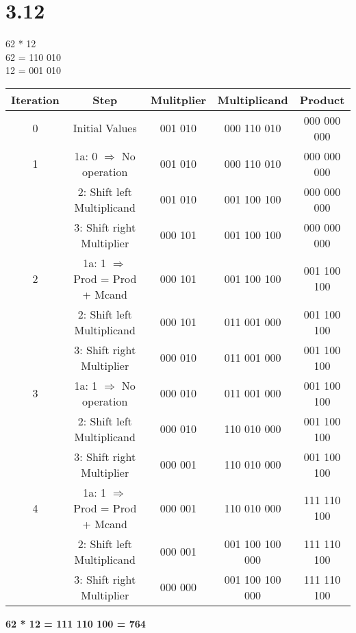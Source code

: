 \documentclass[12pt]{article}
\begin{document}
\section*{3.12}
62 * 12\\
62 = 110 010\\
12 = 001 010\\
\begin{tabular}{|c|c|c|c|c|}
	\hline
	Iteration & Step & Mulitplier & Multiplicand & Product \\
	\hline
	0 & Initial Values & 001 010 & 000 110 010 & 000 000 000\\
	\hline
	1 & 1a: 0 $\Rightarrow$ No operation & 001 010 & 000 110 010 & 000 000 000\\
	  & 2: Shift left Multiplicand & 001 010 & 001 100 100 & 000 000 000\\
	  & 3: Shift right Multiplier & 000 101 & 001 100 100 & 000 000 000\\
	\hline
	2 & 1a:  1 $\Rightarrow$ Prod = Prod + Mcand & 000 101 & 001 100 100 & 001 100 100\\
	  & 2: Shift left Multiplicand & 000 101 & 011 001 000 & 001 100 100 \\
	  & 3: Shift right Multiplier & 000 010 & 011 001 000 & 001 100 100\\
	\hline
	3 & 1a: 1 $\Rightarrow$ No operation & 000 010 & 011 001 000 & 001 100 100\\
	  & 2: Shift left Multiplicand & 000 010 & 110 010 000 & 001 100 100\\
	  & 3: Shift right Multiplier & 000 001 & 110 010 000 & 001 100 100\\
	\hline
	4 & 1a: 1 $\Rightarrow$ Prod = Prod + Mcand & 000 001 & 110 010 000 & 111 110 100 \\
	  & 2: Shift left Multiplicand & 000 001 & 001 100 100 000 & 111 110 100  \\
	  & 3: Shift right Multiplier & 000 000 & 001 100 100 000 & 111 110 100 \\
	\hline
\end{tabular}
\newline
\newline
\textbf{62 * 12 = 111 110 100 = 764}
	 
\end{document}

